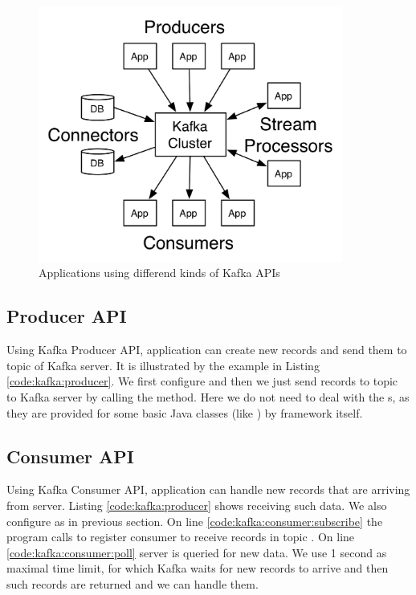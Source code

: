 \begin{figure}[h]
  \center
  \includegraphics[width=100mm]{img/kafka-apis.png}
  \caption{Applications using differend kinds of Kafka APIs}
  \label{frameworks:kafka:api}
\end{figure}




\subsection{Producer API \label{frameworks:kafka:producer}}

Using Kafka Producer API, application can create new records and send them to topic of Kafka server.
It is illustrated by the example in Listing \ref{code:kafka:producer}.
We first configure  and then we just send records to topic 
to Kafka server by calling the  method. Here we do not need to deal with the s,
as they are provided for some basic Java classes (like ) by framework itself.




\subsection{Consumer API \label{frameworks:kafka:consumer}}

Using Kafka Consumer API, application can handle new records that are arriving from server.
Listing \ref{code:kafka:producer} shows receiving such data.
We also configure  as in previous section.
On line \ref{code:kafka:consumer:subscribe} the program calls 
to register consumer to receive records in topic .
On line \ref{code:kafka:consumer:poll} server is queried for new data.
We use 1 second as maximal time limit, for which Kafka waits for new records to
arrive and then such records are returned and we can handle them.


